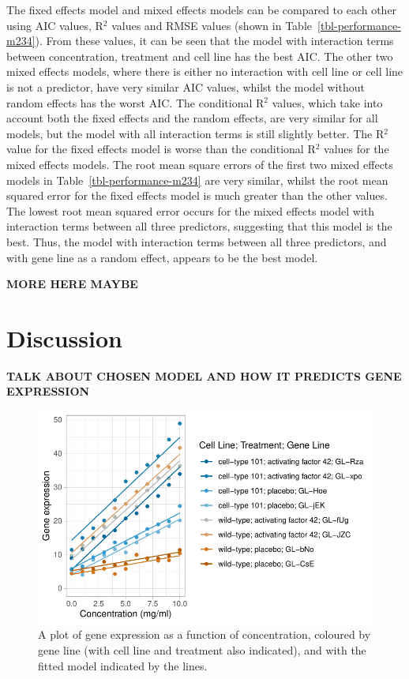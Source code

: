 \documentclass[
  letterpaper,
  DIV=11,
  numbers=noendperiod]{scrartcl}
\begin{document}
The fixed effects model and mixed effects models can be compared to each
other using AIC values, R\(^{2}\) values and RMSE values (shown in
Table~\ref{tbl-performance-m234}). From these values, it can be seen
that the model with interaction terms between concentration, treatment
and cell line has the best AIC. The other two mixed effects models,
where there is either no interaction with cell line or cell line is not
a predictor, have very similar AIC values, whilst the model without
random effects has the worst AIC. The conditional R\(^{2}\) values,
which take into account both the fixed effects and the random effects,
are very similar for all models, but the model with all interaction
terms is still slightly better. The R\(^{2}\) value for the fixed
effects model is worse than the conditional R\(^{2}\) values for the
mixed effects models. The root mean square errors of the first two mixed
effects models in Table~\ref{tbl-performance-m234} are very similar,
whilst the root mean squared error for the fixed effects model is much
greater than the other values. The lowest root mean squared error occurs
for the mixed effects model with interaction terms between all three
predictors, suggesting that this model is the best. Thus, the model with
interaction terms between all three predictors, and with gene line as a
random effect, appears to be the best model.

\textbf{MORE HERE MAYBE}

\hypertarget{discussion}{%
\section{Discussion}\label{discussion}}

\textbf{TALK ABOUT CHOSEN MODEL AND HOW IT PREDICTS GENE EXPRESSION}

\begin{figure}

{\centering \includegraphics{2023-05-16_IMRaD-report_AStephenson_files/figure-pdf/fig-ge-conc-grouping-model-1.pdf}

}

\caption{\label{fig-ge-conc-grouping-model}A plot of gene expression as
a function of concentration, coloured by gene line (with cell line and
treatment also indicated), and with the fitted model indicated by the
lines.}

\end{figure}
\end{document}
